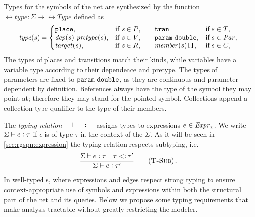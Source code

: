 Types for the symbols of the net are synthesized by the function \(\rel{type}\colon \Sigma \to \rel{Type}\) defined as
\begin{equation}
  \rel{type}(s) = \left\{\begin{array}{@{}l@{\quad}l@{\qquad}l@{\quad}l@{}}
    \lit{place} \text, & \text{if \(s \in P\),}
    & \lit{tran} \text, & \text{if \(s \in T\),} \\
    \vartype{\rel{dep}(s)}{\rel{pretype}(s)} \text, & \text{if \(s \in V\),}
    & \vartype{\lit{param}}{\lit{double}} \text, & \text{if \(s \in \Par\),} \\
    \rel{target}(s) \text, & \text{if \(s \in R\),}
    & \bagtype{\rel{member}(s)} \text, & \text{if \(s \in C\),}
  \end{array}\right.
\end{equation}
The types of places and transitions match their kinds, while variables have a variable type according to their dependence and pretype. The types of parameters are fixed to \(\texttt{\upshape param}\ \texttt{\upshape double}\), as they are continuous and parameter dependent by definition. References always have the type of the symbol they may point at; therefore they may stand for the pointed symbol. Collections append a collection type qualifier to the type of their members.

The \emph{typing relation} \({\_} \vdash {\_} \mathrel{\vcentcolon} {\_}\) assigns types to expressions \(e \in \textrm{\itshape Expr\/}_\Sigma\). We write \(\Sigma \vdash e \mathrel{\vcentcolon} \tau\) if \(e\) is of type \(\tau\) in the context of the  \(\Sigma\). As it will be seen in \vref{sec:rgspn:expression} the typing relation respects subtyping, i.e.
\begin{equation}
  \frac{\Sigma \vdash e \oftype \tau \quad \tau \subtype \tau'}{%
    \Sigma \vdash e \oftype \tau'} \Tag{T-Sub} \,\text.
\end{equation}

In well-typed s, where expressions and edges respect strong typing to ensure context-appropriate use of symbols and expressions within both the structural part of the net and its queries. Below we propose some typing requirements that make analysis tractable without greatly restricting the modeler.

